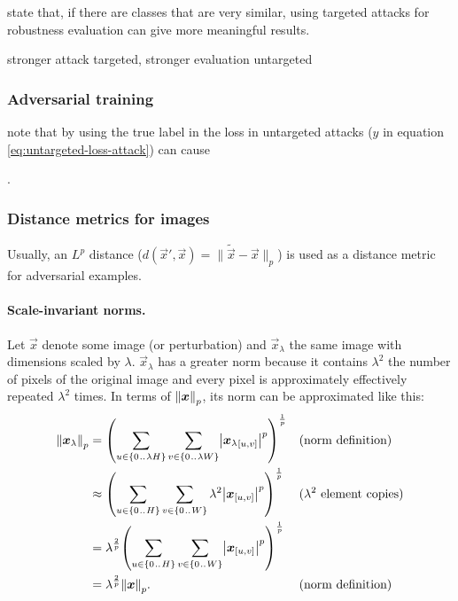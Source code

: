 \documentclass[twocolumn]{article}
\begin{document}
\citet{Athalye:2018:OGGFSS} state that, if there are classes that are very similar, using targeted attacks for robustness evaluation can give more meaningful results. 

stronger attack targeted, stronger evaluation untargeted

\subsubsection{Adversarial training}

\citet{Kurakin:2016:AMLS} note that by using the true label in the loss in untargeted attacks ($y$ in equation \eqref{eq:untargeted-loss-attack}) can cause


\newpage
.
\newpage
\subsubsection{Distance metrics for images}

Usually, an $L^p$ distance ($d(\vec x', \vec x)=\lVert\tilde{\vec x}-\vec x\rVert_p$) is used as a distance metric for adversarial examples.

\paragraph{Scale-invariant norms.}
Let $\vec x$ denote some image (or perturbation) and $\vec x_\lambda$ the same image with dimensions scaled by $\lambda$. $\vec x_\lambda$ has a greater norm because it contains $\lambda^2$ the number of pixels of the original image and every pixel is approximately effectively repeated $\lambda^2$ times. In terms of $\enVert{\vec x}_p$, its norm can be approximated like this:
\begin{align*}
    \enVert{\vec x_\lambda}_p 
    &= \del{\sum_{u\in\cbr{0\bidot\lambda H}}\sum_{v\in\cbr{0\bidot\lambda W}} \envert{{\vec x_\lambda}_\ind{u, v}}^p}^{\frac{1}{p}} && \text{(norm definition)} \\
    &\approx \del{\sum_{u\in\cbr{0\bidot H}}\sum_{v\in\cbr{0\bidot W}} \lambda^2 \envert{{\vec x}_\ind{u, v}}^p}^{\frac{1}{p}} && \text{($\lambda^2$ element copies)} \\
    &= \lambda^\frac{2}{p} \del{\sum_{u\in\cbr{0\bidot H}}\sum_{v\in\cbr{0\bidot W}} \envert{{\vec x}_\ind{u, v}}^p}^{\frac{1}{p}} \\
    &= \lambda^\frac{2}{p} \enVert{\vec x}_p \text{.} && \text{(norm definition)}
\end{align*}
\end{document}
